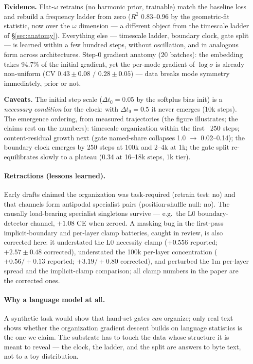 \documentclass[11pt]{article}
\newcommand{\Dt}{\Delta t}
\begin{document}
\textbf{Evidence.} Flat-$\omega$ retrains (no harmonic prior, trainable)
match the baseline loss and rebuild a frequency ladder from zero
($R^2$ 0.83--0.96 by the geometric-fit statistic, now over the $\omega$
dimension --- a different object from the timescale ladder of
\S\ref{sec:anatomy}).
Everything else --- timescale ladder, boundary clock, gate split --- is
learned within a few hundred steps, without oscillation, and in analogous
form across architectures. Step-0 gradient anatomy (20 batches): the
embedding takes 94.7\% of the initial gradient, yet the per-mode gradient
of $\log\sigma$ is already non-uniform (CV $0.43 \pm 0.08$ / $0.28 \pm
0.05$) --- data breaks mode symmetry immediately, prior or not.

\textbf{Caveats.} The initial step scale ($\Dt_0 = 0.05$ by the softplus
bias init) is a \emph{necessary
condition} for the clock: with $\Dt_0 = 0.5$ it never emerges (10k steps).
The emergence ordering, from measured trajectories (the figure
illustrates; the claims rest on the numbers): timescale organization
within the first ~250 steps; content-residual growth next (gate
named-share collapses 1.0 $\to$ 0.02--0.14); the boundary clock emerges by
250 steps at 100k and 2--4k at 1k; the gate split re-equilibrates slowly
to a plateau (0.34 at 16--18k steps, 1k tier).

\paragraph{Retractions (lessons learned).}
Early drafts claimed the organization was task-required (retrain test:
no) and that channels form antipodal specialist pairs (position-shuffle
null: no). The causally load-bearing specialist singletons survive ---
e.g.\ the L0 boundary-detector channel, $+1.08$ CE when zeroed.
A masking bug in the first-pass implicit-boundary and per-layer clamp
batteries, caught in review, is also corrected here: it understated the
L0 necessity clamp ($+0.556$ reported; $+2.57 \pm 0.48$ corrected),
understated the 100k per-layer concentration ($+0.56/+0.13$ reported;
$+3.19/+0.80$ corrected), and perturbed the 1m per-layer spread and the
implicit-clamp comparison; all clamp numbers in the paper are the
corrected ones.

\paragraph{Why a language model at all.}
A synthetic task would show that hand-set gates \emph{can} organize; only
real text shows whether the organization gradient descent builds on
language statistics is the one we claim. The substrate has to touch the
data whose structure it is meant to reveal --- the clock, the ladder, and
the split are answers to byte text, not to a toy distribution.
\end{document}

